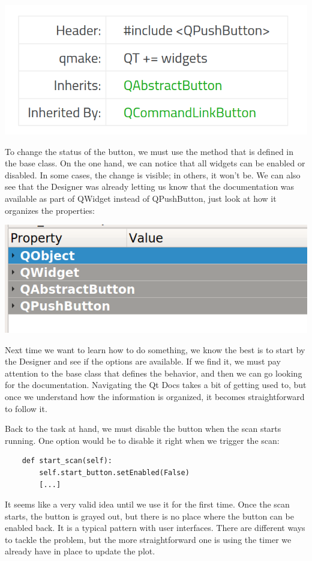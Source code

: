 \begin{center}
    \includegraphics[width=.4\linewidth]{images/Chapter_09/11_Qt_Docs_inheritance.png}
\end{center}

To change the status of the button, we must use the  method that is defined in the base  class. On the one hand, we can notice that all widgets can be enabled or disabled. In some cases, the change is visible; in others, it won't be. We can also see that the Designer was already letting us know that the documentation was available as part of QWidget instead of QPushButton, just look at how it organizes the properties:

\begin{center}
    \includegraphics[width=.4\linewidth]{images/Chapter_09/12_Designer_object_inheritance.png}
\end{center}

Next time we want to learn how to do something, we know the best is to start by the Designer and see if the options are available. If we find it, we must pay attention to the base class that defines the behavior, and then we can go looking for the documentation. Navigating the Qt Docs takes a bit of getting used to, but once we understand how the information is organized, it becomes straightforward to follow it.

Back to the task at hand, we must disable the button when the scan starts running. One option would be to disable it right when we trigger the scan:

\begin{verbatim}
    def start_scan(self):
        self.start_button.setEnabled(False)
        [...]
\end{verbatim}

It seems like a very valid idea until we use it for the first time. Once the scan starts, the button is grayed out, but there is no place where the button can be enabled back. It is a typical pattern with user interfaces. There are different ways to tackle the problem, but the more straightforward one is using the timer we already have in place to update the plot.

